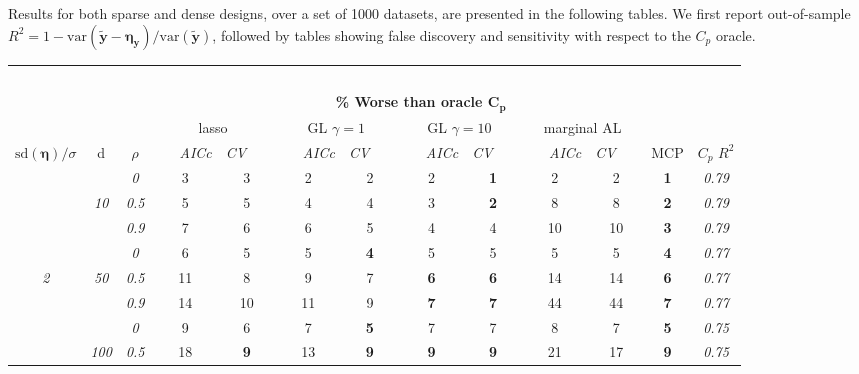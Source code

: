 \documentclass[12pt]{article}
\newcommand{\bs}[1]{\boldsymbol{#1}}
\newcommand{\mr}[1]{\mathrm{#1}}
\newcommand{\bm}[1]{\mathbf{#1}}
\begin{document}
Results for both sparse and dense designs, over a set of 1000 datasets, are presented in the following tables.  We first report out-of-sample $R^2 = 1 -
\mr{var}(\bm{\tilde y} - \bs{\eta}_\bm{y})/\mr{var}(\bm{\tilde y})$, followed by tables showing false discovery and sensitivity with respect to the $C_p$
oracle. 





\begin{table}
\vspace{-.2cm}
\footnotesize
\begin{center}
\begin{tabular}{ccc|cc|cc|cc|cc|c|c}
\hline &&&\multicolumn{9}{|c|}{~}\\[-1ex]
\multicolumn{3}{c}{~}&\multicolumn{9}{|c|}{\bf \% Worse than oracle $\boldsymbol{C_p}$  } &   \\[1ex]
& &
& \multicolumn{2}{c}{lasso} 
& \multicolumn{2}{c}{GL $\gamma=1$} 
& \multicolumn{2}{c}{GL $\gamma=10$} 
& \multicolumn{2}{c}{marginal AL} 
& \multicolumn{1}{c|}{~} & \\[-0.5ex]
$\mr{sd}(\bs{\eta})/\sigma$ & {\sf d} & $\rho$ 
& ~~~\scriptsize\it AICc & \multicolumn{1}{c}{\scriptsize\it CV~~~}
& ~~~\scriptsize\it AICc & \multicolumn{1}{c}{\scriptsize\it CV~~~}
& ~~~\scriptsize\it AICc & \multicolumn{1}{c}{\scriptsize\it CV~~~}
& ~~~\scriptsize\it AICc & \multicolumn{1}{c}{\scriptsize\it CV~~~} 
& \multicolumn{1}{c|}{ MCP} & $C_p$ $R^2$ \\[.5ex]
\hline\rule{0pt}{3ex}
& & \it  0  & 3 & 3 & 2 & 2 & 2 & {\bf 1} & 2 & 2 & {\bf 1} & \it  0.79 \\
 & \it  10  & \it  0.5  & 5 & 5 & 4 & 4 & 3 & {\bf 2} & 8 & 8 & {\bf 2} & \it  0.79 \\
& & \it  0.9  & 7 & 6 & 6 & 5 & 4 & 4 & 10 & 10 & {\bf 3} & \it  0.79 \\[1ex]
\cline{2-3}\rule{0pt}{3ex}
& & \it  0  & 6 & 5 & 5 & {\bf 4} & 5 & 5 & 5 & 5 & {\bf 4} & \it  0.77 \\
\it  2  & \it  50  & \it  0.5  & 11 & 8 & 9 & 7 & {\bf 6} & {\bf 6} & 14 & 14 & {\bf 6} & \it  0.77 \\
& & \it  0.9  & 14 & 10 & 11 & 9 & {\bf 7} & {\bf 7} & 44 & 44 & {\bf 7} & \it  0.77 \\[1ex]
\cline{2-3}\rule{0pt}{3ex}
& & \it  0  & 9 & 6 & 7 & {\bf 5} & 7 & 7 & 8 & 7 & {\bf 5} & \it  0.75 \\
 & \it  100  & \it  0.5  & 18 & {\bf 9} & 13 & {\bf 9} & {\bf 9} & {\bf 9} & 21 & 17 & {\bf 9} & \it  0.75 \\

\end{tabular}
\end{center}
\end{table}
\end{document}
